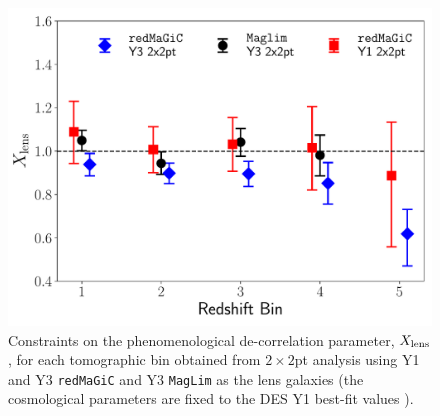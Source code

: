 \documentclass[aps, prd,twocolumn,superscriptaddress,nofootinbib,preprintnumbers]{revtex4-1}
\newcommand{\gammat}{\ensuremath{\gamma_{\rm t}(\theta)}}
\newcommand{\wtheta}{\ensuremath{w(\theta)}}
\newcommand{\redmagic}{\texttt{redMaGiC} }
\newcommand{\maglim}{\texttt{MagLim} }
\newcommand{\IR}[1]{{\color{red}[\textbf{Note for IR}: #1]}}
\begin{document}




\begin{figure}
\includegraphics[width=\columnwidth]{figs/xlens_comp.pdf}
\caption[]{Constraints on the phenomenological de-correlation parameter, $X_{\rm lens}$, for each tomographic bin obtained from $2\times 2$pt analysis using Y1 and Y3 \redmagic and Y3 \maglim as the lens galaxies (the cosmological parameters are fixed to the DES Y1 best-fit values \citep{Abbott_2018}).}
\label{fig:Xlens_5X_y1y3}
\end{figure}
\end{document}
